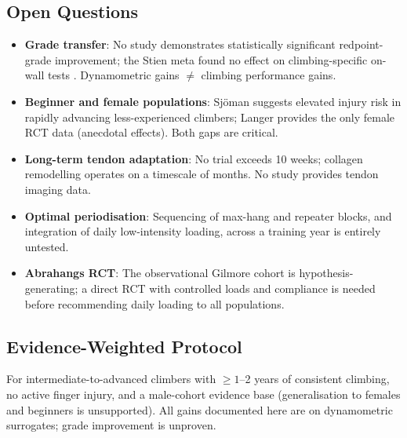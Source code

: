 \documentclass[12pt,a4paper]{article}
\begin{document}
\subsection{Open Questions}

\begin{itemize}[noitemsep, topsep=2pt]
  \item \textbf{Grade transfer}: No study demonstrates statistically significant redpoint-grade improvement; the Stien meta found no effect on climbing-specific on-wall tests \cite{stien2023}. Dynamometric gains $\neq$ climbing performance gains.
  \item \textbf{Beginner and female populations}: Sjöman \cite{sjoman2023} suggests elevated injury risk in rapidly advancing less-experienced climbers; Langer \cite{langer2024} provides the only female RCT data (anecdotal effects). Both gaps are critical.
  \item \textbf{Long-term tendon adaptation}: No trial exceeds 10 weeks; collagen remodelling operates on a timescale of months. No study provides tendon imaging data.
  \item \textbf{Optimal periodisation}: Sequencing of max-hang and repeater blocks, and integration of daily low-intensity loading, across a training year is entirely untested.
  \item \textbf{Abrahangs RCT}: The observational Gilmore cohort \cite{gilmore2024} is hypothesis-generating; a direct RCT with controlled loads and compliance is needed before recommending daily loading to all populations.
\end{itemize}

\subsection{Evidence-Weighted Protocol}

For intermediate-to-advanced climbers with $\geq1$--2 years of consistent climbing, no active finger injury, and a male-cohort evidence base (generalisation to females and beginners is unsupported). All gains documented here are on dynamometric surrogates; grade improvement is unproven.
\end{document}
